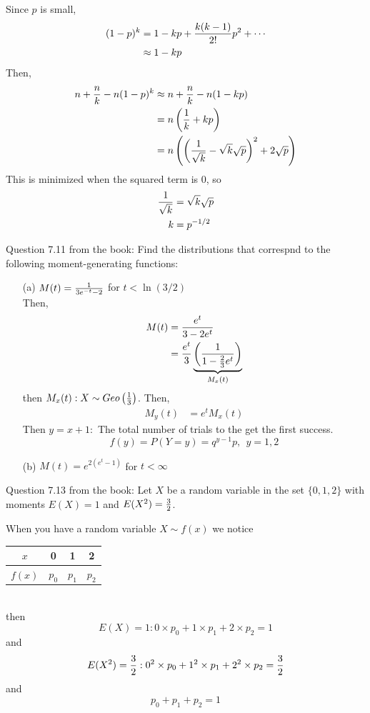 \documentclass[english, 11pt]{article}
\begin{document}
\begin{itemize}
    Since $p$ is small,
    \begin{align*}
      (1-p)^k & = 1 - kp + \frac{k(k-1)}{2!}p^2 + \cdots \\
      & \approx 1 - kp
    \end{align*}
    Then,
    \begin{align*}
      n + \frac{n}{k} - n(1-p)^k  & \approx n + \frac{n}{k} - n(1-kp) \\
      & = n \left( \frac{1}{k} + kp \right) \\
      & = n \left( \left( \frac{1}{\sqrt{k}} - \sqrt{k}\sqrt{p} \right)^2 + 2\sqrt{p} \right)
    \end{align*}
    This is minimized when the squared term is 0, so
    \begin{align*}
      \frac{1}{\sqrt{k}} & = \sqrt{k}\sqrt{p} \\
      k & = p^{-1/2}
    \end{align*}
  \end{itemize}

  Question 7.11 from the book: Find the distributions that correspnd to the following moment-generating functions:
  \begin{itemize}
    \item[(a)] $M(t) = \frac{1}{3e^{-t} -2}$ for $t < \ln(3/2)$ \\

    Then,
    \begin{align*}
      M(t) & = \frac{e^t}{3-2e^t} \\
      & = \frac{e^t}{3} \underbrace{\left( \frac{1}{1 - \frac{2}{3}e^t} \right)}_{M_x(t)}
    \end{align*}
    then $M_x(t): X \sim Geo \left( \frac{1}{3} \right)$. Then,
    \begin{align*}
      M_y(t) & = e^tM_x(t)
    \end{align*}
    Then $y = x +1:$ The total number of trials to the get the first success.
    \[ f(y) = P(Y = y) = q^{y-1}p, \ \ y = 1,2 \]

    \item[(b)] $M(t) = e^{2(e^t -1)}$ for $t < \infty$
  \end{itemize}

  Question 7.13 from the book: Let $X$ be a random variable in the set $\{0,1,2\}$ with moments $E(X) = 1$ and $E(X^2) = \frac{3}{2}$. \\

  \begin{note}
    When you have a random variable $X \sim f(x)$ we notice
    \begin{tabular}{c | c c c}
        $x$ & 0 & 1 & 2 \\
        \hline
        $f(x)$ & $p_0$ & $p_1$ & $p_2$
      \end{tabular} \\
    then
    \[ E(X) = 1: 0\times p_0 + 1\times p_1 + 2 \times p_2 = 1 \] and
    \[ E(X^2) = \frac{3}{2}: 0^2\times p_0 + 1^2 \times p_1 + 2^2 \times p_2 = \frac{3}{2}\] and
    \[ p_0 + p_1 + p_2 = 1 \]

  \end{note}
\end{document}
